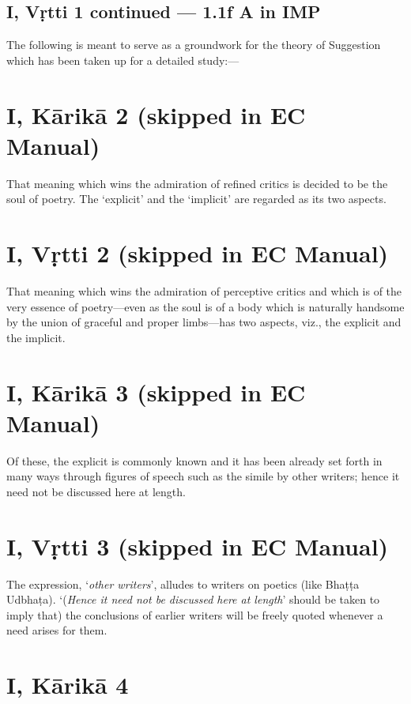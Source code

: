 \documentclass[12pt]{book}
\begin{document}
\subsection{I, Vṛtti 1 continued --- 1.1f A in IMP}

The following is meant to serve as a groundwork for the
theory of Suggestion which has been taken up for a detailed
study:---


\section{I, Kārikā 2 (skipped in EC Manual)}

That meaning which wins the admiration of refined critics
is decided to be the soul of poetry. The `explicit' and the
`implicit' are regarded as its two aspects.


\section{I, Vṛtti 2 (skipped in EC Manual)}

That meaning which wins the admiration of perceptive
critics and which is of the very essence of poetry---even as the
soul is of a body which is naturally handsome by the union of
graceful and proper limbs---has two aspects, viz., the explicit
and the implicit.


\section{I, Kārikā 3 (skipped in EC Manual)}

Of these, the explicit is commonly known and it has been
already set forth in many ways through figures of speech such
as the simile by other writers; hence it need not be discussed
here at length.


\section{I, Vṛtti 3 (skipped in EC Manual)}

The expression, `\textit{other writers}', alludes to writers on poetics
(like Bhaṭṭa Udbhaṭa). `(\textit{Hence it need not be discussed here at
length}' should be taken to imply that) the conclusions of earlier
writers will be freely quoted whenever a need arises for them.


\section{I, Kārikā 4}
\end{document}
